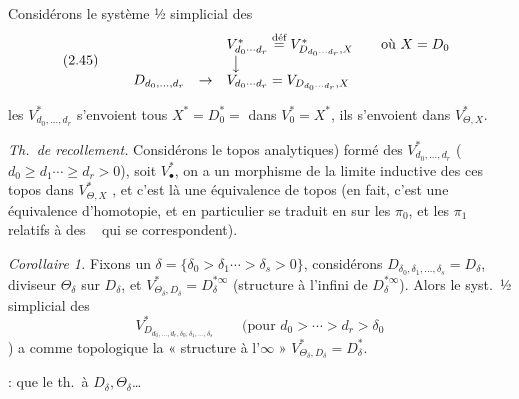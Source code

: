 \documentclass[11pt,a4paper]{article}
\begin{document}
Considérons le système ½ simplicial des
\[
(2.45)\qquad
\begin{array}{ccl}
 & & V^*_{d_0\cdots d_r}\overset{\text{déf}}{=}V^*_{D_{d_0\cdots d_r},X}\qquad\text{où }X=D_0\\
 & & \ \big\downarrow\\
D_{d_0,\dots,d_r} & \to & V_{d_0\cdots d_r}=V_{D_{d_0\cdots d_r},X}
\end{array}
\]

les $V^*_{d_0,\dots,d_r}$ s'envoient tous  $X^*=D^*_0=$  dans $V^*_0=X^*$, ils  s'envoient dans $V^*_{\Theta,X}$.

\emph{Th.\ de recollement.} Considérons le   topos   analytiques) formé des $V^*_{d_0,\dots,d_r}$ ($d_0\geq d_1\cdots\geq d_r>0$),  soit $V^*_{\bullet}$, on a un morphisme de la limite inductive des ces topos dans $V^*_{\Theta,X}$ , et c'est là une équivalence de topos (en fait, c'est une équivalence d'homotopie, et en particulier se traduit en  sur les $\pi_0$, et les $\pi_1$ relatifs à des ~\ill{} qui se correspondent).

\emph{Corollaire 1.} Fixons un $\delta=\{\delta_0>\delta_1\cdots>\delta_s>0\}$, considérons $D_{\delta_0,\delta_1,\dots,\delta_s}=D_\delta$,  diviseur $\Theta_\delta$ sur $D_\delta$, et $V^*_{\Theta_\delta,D_\delta}=D_\delta^{*\infty}$ (structure à l'infini de $D_\delta^{*\infty}$). Alors le syst.\ ½ simplicial des
\[
V^*_{D_{d_0,\dots,d_r,\delta_0,\delta_1,\dots,\delta_s}}\qquad(\text{pour }d_0>\cdots>d_r>\delta_0
\]
) a comme \struck{\ill{}}  topologique la « structure à l'$\infty$ » $V^*_{\Theta_\delta,D_\delta}=D^*_\delta$.

 : \ill{} que le th.\ à $D_\delta,\Theta_\delta$\ldots
\end{document}
